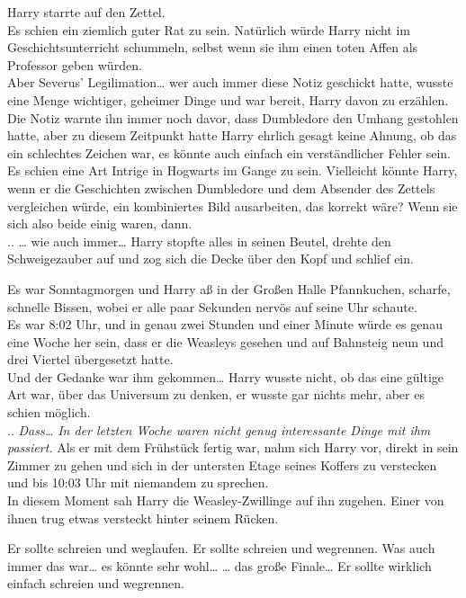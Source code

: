 {Harry starrte auf den Zettel.\\ Es schien ein ziemlich guter Rat zu sein. Natürlich würde Harry nicht im Geschichtsunterricht schummeln, selbst wenn sie ihm einen toten Affen als Professor geben würden.\\ Aber Severus' Legilimation… wer auch immer diese Notiz geschickt hatte, wusste eine Menge wichtiger, geheimer Dinge und war bereit, Harry davon zu erzählen.\\ Die Notiz warnte ihn immer noch davor, dass Dumbledore den Umhang gestohlen hatte, aber zu diesem Zeitpunkt hatte Harry ehrlich gesagt keine Ahnung, ob das ein schlechtes Zeichen war, es könnte auch einfach ein verständlicher Fehler sein.\\ Es schien eine Art Intrige in Hogwarts im Gange zu sein. Vielleicht könnte Harry, wenn er die Geschichten zwischen Dumbledore und dem Absender des Zettels vergleichen würde, ein kombiniertes Bild ausarbeiten, das korrekt wäre? Wenn sie sich also beide einig waren, dann.\\ .. … wie auch immer… Harry stopfte alles in seinen Beutel, drehte den Schweigezauber auf und zog sich die Decke über den Kopf und schlief ein.

Es war Sonntagmorgen und Harry aß in der Großen Halle Pfannkuchen, scharfe, schnelle Bissen, wobei er alle paar Sekunden nervös auf seine Uhr schaute.\\ Es war 8:02 Uhr, und in genau zwei Stunden und einer Minute würde es genau eine Woche her sein, dass er die Weasleys gesehen und auf Bahnsteig neun und drei Viertel übergesetzt hatte.\\ Und der Gedanke war ihm gekommen… Harry wusste nicht, ob das eine gültige Art war, über das Universum zu denken, er wusste gar nichts mehr, aber es schien möglich.\\ .. \emph{Dass… In der letzten Woche waren nicht genug interessante Dinge mit ihm passiert.} Als er mit dem Frühstück fertig war, nahm sich Harry vor, direkt in sein Zimmer zu gehen und sich in der untersten Etage seines Koffers zu verstecken und bis 10:03 Uhr mit niemandem zu sprechen.\\ In diesem Moment sah Harry die Weasley-Zwillinge auf ihn zugehen. Einer von ihnen trug etwas versteckt hinter seinem Rücken.

Er sollte schreien und weglaufen. Er sollte schreien und wegrennen. Was auch immer das war… es könnte sehr wohl… … das große Finale… Er sollte wirklich einfach schreien und wegrennen.

}
